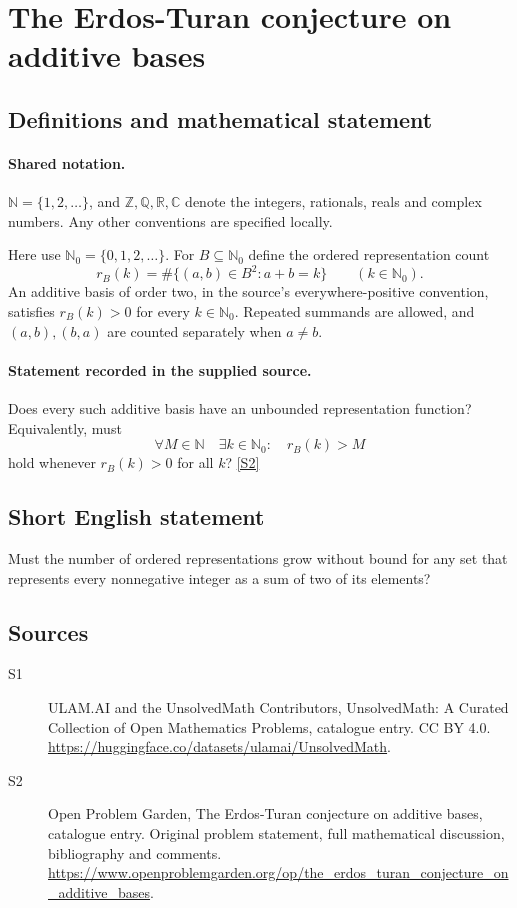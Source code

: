 \documentclass[11pt]{article}
\newcommand{\sref}[2]{\hyperlink{source:#1:#2}{[S#2]}}
\begin{document}
\section{The Erdos-Turan conjecture on additive bases}\label{statement}

\subsection{Definitions and mathematical statement}

\paragraph{Shared notation.}$\mathbb N=\{1,2,\ldots\}$, and $\mathbb Z,\mathbb Q,\mathbb R,\mathbb C$ denote the integers, rationals, reals and complex numbers. Any other conventions are specified locally.


Here use $\mathbb N_0=\{0,1,2,\ldots\}$. For $B\subseteq\mathbb N_0$ define the ordered representation count
\[
 r_B(k)=\#\{(a,b)\in B^2:a+b=k\}\qquad(k\in\mathbb N_0).
\]
An additive basis of order two, in the source's everywhere-positive convention, satisfies $r_B(k)>0$ for every $k\in\mathbb N_0$. Repeated summands are allowed, and $(a,b),(b,a)$ are counted separately when $a\ne b$.
\paragraph{Statement recorded in the supplied source.}
Does every such additive basis have an unbounded representation function? Equivalently, must
\[
 \forall M\in\mathbb N\quad\exists k\in\mathbb N_0:\quad r_B(k)>M
\]
hold whenever $r_B(k)>0$ for all $k$? \sref{statement}{2}
\subsection{Short English statement}
Must the number of ordered representations grow without bound for any set that represents every nonnegative integer as a sum of two of its elements?
\subsection{Sources}
\begin{description}
\item[\hypertarget{source:statement:1}{S1}] ULAM.AI and the UnsolvedMath Contributors, UnsolvedMath: A Curated Collection of Open Mathematics Problems, catalogue entry. CC BY 4.0. \url{https://huggingface.co/datasets/ulamai/UnsolvedMath}.
\item[\hypertarget{source:statement:2}{S2}] Open Problem Garden, The Erdos-Turan conjecture on additive bases, catalogue entry. Original problem statement, full mathematical discussion, bibliography and comments. \url{https://www.openproblemgarden.org/op/the_erdos_turan_conjecture_on_additive_bases}.
\end{description}
\label{end:statement}
\end{document}
